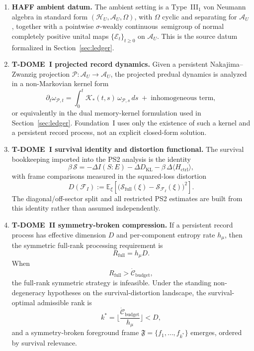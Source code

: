 \documentclass[12pt]{article}
\theoremstyle{definition}
\theoremstyle{remark}
\newcommand{\FIAppendixContinuityPhrase}{pointwise \(\sigma\)-weakly continuous}
\begin{document}
\begin{enumerate}
\item \textbf{HAFF ambient datum.}
The ambient setting is a Type~III\(_1\) von Neumann algebra in standard
form \((\mathcal H_U,\mathcal A_U,\Omega)\), with \(\Omega\) cyclic and
separating for \(\mathcal A_U\), together with a
\FIAppendixContinuityPhrase\ semigroup of normal completely positive
unital maps \(\{\mathcal E_t\}_{t\ge 0}\) on \(\mathcal A_U\). This is
the source datum formalized in Section~\ref{sec:ledger}.

\item \textbf{T-DOME~I projected record dynamics.}
Given a persistent Nakajima--Zwanzig projection
\(\mathcal P:\mathcal A_U\to\mathcal A_U\), the projected predual
dynamics is analyzed in a non-Markovian kernel form
\[
\partial_t \omega_{\mathcal P,t}
=
\int_0^t \mathcal K_*(t,s)\,\omega_{\mathcal P,s}\,ds
\;+\; \text{inhomogeneous term},
\]
or equivalently in the dual memory-kernel formulation used in
Section~\ref{sec:ledger}. Foundation~I uses only the existence of such a
kernel and a persistent record process, not an explicit closed-form
solution.

\item \textbf{T-DOME~I survival identity and distortion functional.}
The survival bookkeeping imported into the PS2 analysis is the identity
\[
\beta\,\mathcal S
=
-\Delta I(S{:}E)
-\Delta D_{\mathrm{KL}}
-\beta\,\Delta\langle H_{\mathrm{ctrl}}\rangle,
\]
with frame comparisons measured in the squared-loss distortion
\[
D(\mathcal F_I)
:=
\mathbb E_\xi\!\left[
\bigl(
\mathcal S_{\mathrm{full}}(\xi)
-\mathcal S_{\mathcal F_I}(\xi)
\bigr)^2
\right].
\]
The diagonal/off-sector split and all restricted PS2 estimates are built
from this identity rather than assumed independently.

\item \textbf{T-DOME~II symmetry-broken compression.}
If a persistent record process has effective dimension \(D\) and
per-component entropy rate \(h_\mu\), then the symmetric full-rank
processing requirement is
\[
R_{\mathrm{full}}=h_\mu D.
\]
When
\[
R_{\mathrm{full}}
>
\dot{\mathcal C}_{\mathrm{budget}},
\]
the full-rank symmetric strategy is infeasible. Under the standing
non-degeneracy hypotheses on the survival-distortion landscape, the
survival-optimal admissible rank is
\[
k^*
=
\Big\lfloor
\frac{\dot{\mathcal C}_{\mathrm{budget}}}{h_\mu}
\Big\rfloor
< D,
\]
and a symmetry-broken foreground frame
\(\mathfrak F=\{f_1,\dots,f_{k^*}\}\) emerges, ordered by survival
relevance.


\end{enumerate}
\end{document}
